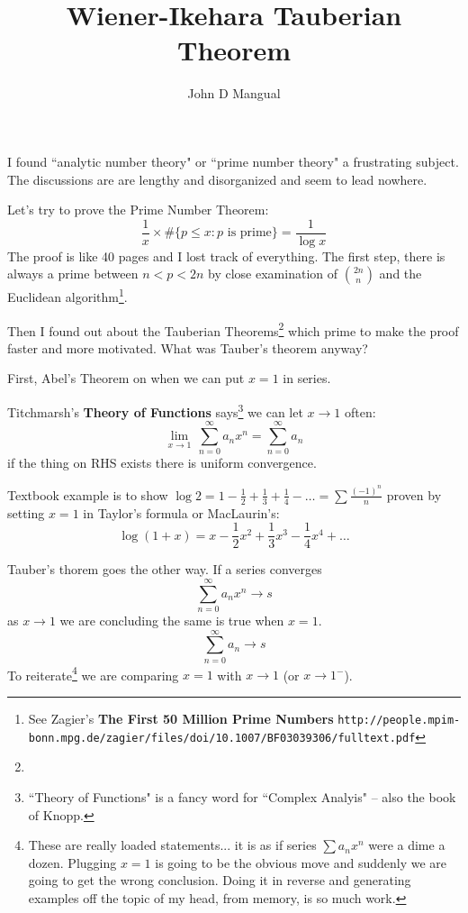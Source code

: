 \documentclass[12pt]{article}
\title{\textbf{ Wiener-Ikehara Tauberian Theorem }}
\author{John D Mangual}
\date{}
\begin{document}
\selectfont \fontsize{25}{30}\selectfont

\maketitle

\noindent I found ``analytic number theory" or ``prime number theory" a frustrating subject.  The discussions are are lengthy and disorganized and seem to lead nowhere. \newline  

\noindent Let's try to prove the Prime Number Theorem:
$$ \frac{1}{x} \times \# \big\{ p \leq x:  p \text{ is prime}  \big\} = \frac{1}{\log x} $$
The proof is like 40 pages and I lost track of everything.  The first step, there is always a prime between $n < p < 2n$ by close examination of $\binom{2n}{n}$ and the Euclidean algorithm\footnote{See Zagier's \textbf{The First 50 Million Prime Numbers} \texttt{http://people.mpim-bonn.mpg.de/zagier/files/doi/10.1007/BF03039306/fulltext.pdf}}.

\newpage

\noindent Then I found out about the Tauberian Theorems\footnote{} which prime to make the proof faster and more motivated.  What was Tauber's theorem anyway? \newline

\noindent First, Abel's Theorem on when we can put $x =1$ in series. \newline

\noindent Titchmarsh's \textbf{Theory of Functions} says\footnote{``Theory of Functions" is a fancy word for ``Complex Analyis" -- also the book of Knopp.} we can let $x \to 1$ often:
$$ \lim_{x \to 1} \, \sum_{n=0}^\infty a_n x^n = 
\sum_{n=0}^\infty a_n $$
if the thing on RHS exists there is uniform convergence. \newline

\noindent Textbook example is to show $\log 2 = 1 - \frac{1}{2} + \frac{1}{3} + \frac{1}{4}-\dots = \sum  \frac{(-1)^n}{n}$ proven by setting $x = 1$ in Taylor's formula or MacLaurin's:
$$ \log (1+x) = x - \frac{1}{2}x^2 + \frac{1}{3} x^3 - \frac{1}{4}x^4 + \dots $$

\newpage

\noindent Tauber's thorem goes the other way.  If a series converges 
$$ \sum_{n=0}^\infty a_n x^n \to s $$
as $x \to 1$ we are concluding the same is true when $x = 1$.
$$ \sum_{n=0}^\infty a_n \to s $$
To reiterate\footnote{These are really loaded statements... it is as if series $\sum a_n x^n$ were a dime a dozen.  Plugging $x = 1$ is going to be the obvious move and suddenly we are going to get the wrong conclusion.  Doing it in reverse and generating examples off the topic of my head, from memory, is so much work.} we are comparing $x = 1$ with $x \to 1$ (or $x \to 1^-$). \newline
\end{document}
